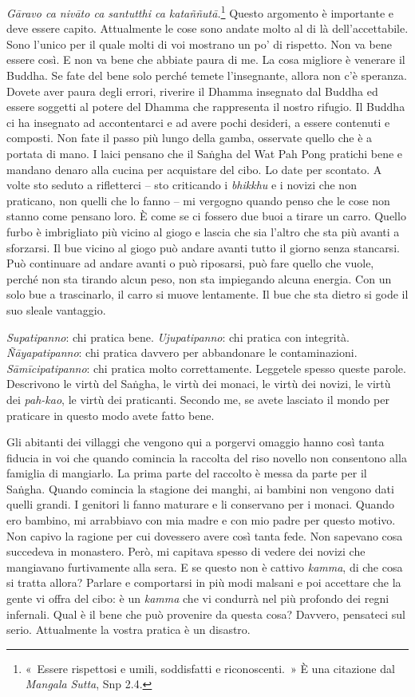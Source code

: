 \emph{Gāravo ca nivāto ca santutthi ca kataññutā.}\footnote{«~Essere
  rispettosi e umili, soddisfatti e riconoscenti.~» È una citazione dal
  \emph{Mangala} \emph{Sutta}, Snp 2.4.} Questo argomento è importante e
deve essere capito. Attualmente le cose sono andate molto al di là
dell'accettabile. Sono l'unico per il quale molti di voi mostrano un po'
di rispetto. Non va bene essere così. E non va bene che abbiate paura di
me. La cosa migliore è venerare il Buddha. Se fate del bene solo perché
temete l'insegnante, allora non c'è speranza. Dovete aver paura degli
errori, riverire il Dhamma insegnato dal Buddha ed essere soggetti al
potere del Dhamma che rappresenta il nostro rifugio. Il Buddha ci ha
insegnato ad accontentarci e ad avere pochi desideri, a essere contenuti
e composti. Non fate il passo più lungo della gamba, osservate quello
che è a portata di mano. I laici pensano che il Saṅgha del Wat Pah Pong
pratichi bene e mandano denaro alla cucina per acquistare del cibo. Lo
date per scontato. A volte sto seduto a rifletterci -- sto criticando i
\emph{bhikkhu} e i novizi che non praticano, non quelli che lo fanno --
mi vergogno quando penso che le cose non stanno come pensano loro. È
come se ci fossero due buoi a tirare un carro. Quello furbo è
imbrigliato più vicino al giogo e lascia che sia l'altro che sta più
avanti a sforzarsi. Il bue vicino al giogo può andare avanti tutto il
giorno senza stancarsi. Può continuare ad andare avanti o può riposarsi,
può fare quello che vuole, perché non sta tirando alcun peso, non sta
impiegando alcuna energia. Con un solo bue a trascinarlo, il carro si
muove lentamente. Il bue che sta dietro si gode il suo sleale vantaggio.

\emph{Supatipanno}: chi pratica bene. \emph{Ujupatipanno}: chi pratica
con integrità. \emph{Ñāyapatipanno}: chi pratica davvero per abbandonare
le contaminazioni. \emph{Sāmīcipatipanno}: chi pratica molto
correttamente. Leggetele spesso queste parole. Descrivono le virtù del
Saṅgha, le virtù dei monaci, le virtù dei novizi, le virtù dei
\emph{pah-kao}, le virtù dei praticanti. Secondo me, se avete lasciato
il mondo per praticare in questo modo avete fatto bene.

Gli abitanti dei villaggi che vengono qui a porgervi omaggio hanno così
tanta fiducia in voi che quando comincia la raccolta del riso novello
non consentono alla famiglia di mangiarlo. La prima parte del raccolto è
messa da parte per il Saṅgha. Quando comincia la stagione dei manghi, ai
bambini non vengono dati quelli grandi. I genitori li fanno maturare e
li conservano per i monaci. Quando ero bambino, mi arrabbiavo con mia
madre e con mio padre per questo motivo. Non capivo la ragione per cui
dovessero avere così tanta fede. Non sapevano cosa succedeva in
monastero. Però, mi capitava spesso di vedere dei novizi che mangiavano
furtivamente alla sera. E se questo non è cattivo \emph{kamma}, di che
cosa si tratta allora? Parlare e comportarsi in più modi malsani e poi
accettare che la gente vi offra del cibo: è un \emph{kamma} che vi
condurrà nel più profondo dei regni infernali. Qual è il bene che può
provenire da questa cosa? Davvero, pensateci sul serio. Attualmente la
vostra pratica è un disastro.

